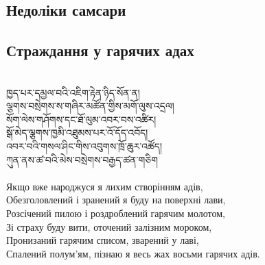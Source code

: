 \subsection{Недоліки самсари}

\subsection*{Страждання у гарячих адах}
\\
\ti
ཁྱད་པར་དམྱལ་བའི་འཇིག་རྟེན་ཉིད་སོན་ན།\\
ལྕགས་བསྲེགས་ས་གཞིར་མཚོན་གྱིས་མགོ་ལུས་འདྲལ།\\
སོག་ལེས་གཤོགས་དང་ཐོ་ལུམ་འབར་བས་འཚིར།\\
སྒོ་མེད་ལྕགས་ཁྱམི་འཐུམས་པར་འོ་དོད་འབོད།\\
འབར་བའི་གསལ་ཤིང་གིས་འབུགས་ཁྲོ་ཆུར་འཚོད།\\
ཀུན་ནས་ཚ་བའི་མེས་བསྲེགས་བརྒྱད་ཚན་གཅིག\\
\\
\ru
Якщо вже народжуся я лихим створінням адів,\\
Обезголовлений і зранений я буду на поверхні лави,\\
Розсічений пилою і роздроблений гарячим молотом,\\
Зі страху буду вити, оточений залізним мороком,\\
Пронизаний гарячим списом, зварений у лаві,\\
Спалений полум'ям, пізнаю я весь жах восьми гарячих адів.\\
\\

\newpage
